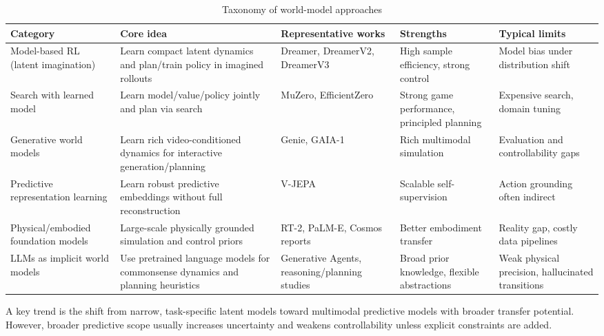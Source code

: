 \documentclass[conference]{IEEEtran}
\begin{document}
\begin{table}[t]
\centering
\small
\caption{Taxonomy of world-model approaches}
\label{tab:wm-taxonomy}
\begin{tabular}{p{3.0cm} p{3.2cm} p{3.6cm} p{3.0cm} p{2.8cm}}
\toprule
Category & Core idea & Representative works & Strengths & Typical limits \\
\midrule
Model-based RL (latent imagination) & Learn compact latent dynamics and plan/train policy in imagined rollouts & Dreamer, DreamerV2, DreamerV3 \cite{hafner2020dream, hafner2021mastering, hafner2023mastering} & High sample efficiency, strong control & Model bias under distribution shift \\

Search with learned model & Learn model/value/policy jointly and plan via search & MuZero, EfficientZero \cite{schrittwieser2020muzero, ye2021mastering} & Strong game performance, principled planning & Expensive search, domain tuning \\

Generative world models & Learn rich video-conditioned dynamics for interactive generation/planning & Genie, GAIA-1 \cite{bruce2024genie, hu2023gaia} & Rich multimodal simulation & Evaluation and controllability gaps \\

Predictive representation learning & Learn robust predictive embeddings without full reconstruction & V-JEPA \cite{bardes2024jepa} & Scalable self-supervision & Action grounding often indirect \\

Physical/embodied foundation models & Large-scale physically grounded simulation and control priors & RT-2, PaLM-E, Cosmos reports \cite{brohan2023rt2, driess2023palme, nvidia2025cosmos} & Better embodiment transfer & Reality gap, costly data pipelines \\

LLMs as implicit world models & Use pretrained language models for commonsense dynamics and planning heuristics & Generative Agents, reasoning/planning studies \cite{park2023generative, yao2023react} & Broad prior knowledge, flexible abstractions & Weak physical precision, hallucinated transitions \\
\bottomrule
\end{tabular}
\end{table}

A key trend is the shift from narrow, task-specific latent models toward multimodal predictive models with broader transfer potential. However, broader predictive scope usually increases uncertainty and weakens controllability unless explicit constraints are added.
\end{document}
